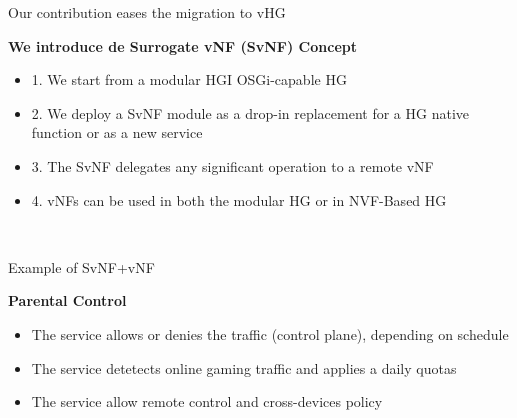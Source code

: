 \documentclass[a4paper]{beamer}
\begin{document}
\begin{frame}{Our contribution eases the migration to vHG}
	
	\begin{flushleft}	
		\textbf{We introduce de Surrogate vNF (SvNF) Concept}
		\begin{itemize}
			\item 1. We start from a modular HGI OSGi-capable HG
			\item 2. We deploy a SvNF module as a drop-in replacement for a HG native function or as a new service
			\item 3. The SvNF delegates any significant operation to a remote vNF
			\item 4. vNFs can be used in both the modular HG or in NVF-Based HG
		\end{itemize}
	\end{flushleft}
	\centering
	\\
			
\end{frame}

\begin{frame}{Example of SvNF+vNF}
	\begin{flushleft}	
		\textbf{Parental Control}
		\begin{itemize}
			\item The service allows or denies the traffic (control plane), depending on schedule
			\item The service detetects online gaming traffic and applies a daily quotas
			\item The service allow remote control and cross-devices policy
		\end{itemize}
	\end{flushleft}
	\vspace{2em}
	\centering
	\\
			
\end{frame}
\end{document}
